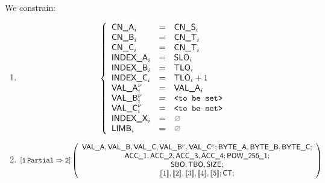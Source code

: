 \begin{center}
\end{center}

We constrain:
\begin{enumerate}
	\item 
\[
	\left\{
	\begin{array}{lclr}
		\cnA      _{i}       & = & \cnS_{i}            \\
		\cnB      _{i}       & = & \cnT_{i}            \\
		\cnC      _{i}       & = & \cnT_{i}            \\
		\indexA   _{i}       & = & \slo_{i}            \\
		\indexB   _{i}       & = & \tlo_{i}            \\
		\indexC   _{i}       & = & \tlo_{i} + 1        \\
		\valA     _{i}\new{} & = & \valA_{i}           \\
		\valB     _{i}\new{} & = & \valueToBeSet       \\
		\valC     _{i}\new{} & = & \valueToBeSet       \\
		\indexX   _{i}       & = & \nothing            \\
		\limb     _{i}       & = & \nothing            \\
	\end{array}
	\right.
\]
	\item 
\[
	\onePartialToTwo
	\left(
	\begin{array}{c}
		\valA{}, \valB{}, \valC{},
		\valB{}\new, \valC{}\new;
		\BYTEA{}, \BYTEB{}, \BYTEC{};
		\\
		\acc{1}, \acc{2}, \acc{3}, \acc{4}; \pow{1};
		\\
		\sbo{}, \tbo{}, \size{};
		\\
		\bit{1}, \bit{2}, \bit{3}, \bit{4}, \bit{5}; \ct{};
	\end{array}
	\right)
\]
\end{enumerate}
